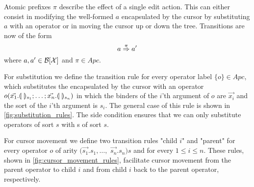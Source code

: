 \documentclass[sigplan,screen]{acmart}
\begin{document}
Atomic prefixes $\pi$ describe the effect of a single edit action. This can
either consist in modifying the well-formed \abt $a$ encapsulated by the
cursor by substituting $a$ with an operator or in moving the
cursor up or down the tree. Transitions are now of the form 
%
\[ a \stackrel{\pi}{\Rightarrow} a' \]
where $a, a' \in \mathcal{B}[\mathcal{X} ]$ and $\pi \in Apc$.

For substitution we define the transition rule for every operator label
$\{o\} \in Apc$, which substitutes the \abt encapsulated by
the cursor with an operator
$o(\Vec{x_1}.\llparenthesis \ \rrparenthesis_{s_1}; \dots ; \Vec{x_n}.\llparenthesis \ \rrparenthesis_{s_n})$ in which
the binders of the $i$'th argument of $o$ are $\Vec{x_i}$ and the sort
of the $i$'th argument is $s_i$. The general case of this rule is
shown in \cref{fig:substitution_rules}. The side condition ensures
that we can only substitute operators of sort $s$ with {\abt}s of
sort $s$.


For cursor movement we define two transition rules "child  $i$" and
"parent" for every operator $o$ of arity $(\Vec{s_1}.s_1, \dots,$ $
\Vec{s_n}.s_n)s$ and for every $1 \leq i \leq n$. These rules, shown
in \cref{fig:cursor_movement_rules}, facilitate cursor movement from
the parent operator to child $i$ and from child $i$ back to the parent
operator, respectively.

\end{document}

